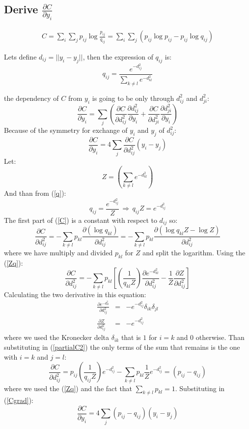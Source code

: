 \documentclass{article}
\begin{document}
\subsection{Derive $\frac{\partial C}{\partial y_{i}}$}
\begin{align}
\label{C}
C=\sum_i\sum_j p_{ij}\log \frac{p_{ij}}{q_{ij}}= \sum_i\sum_j (p_{ij}\log p_{ij}-p_{ij}\log q_{ij})
\end{align}

Lets define $d_{ij}=|| y_i -y_j ||$, then the expression of $q_{ij}$ is:
\begin{equation}\label{q}
q_{ij} =\frac{e^{-d_{ij}^2}}{\sum_{k\neq l} e^{-d_{kl}^2}}
\end{equation}

the dependency of $C$ from $y_i$ is going to be only through $d_{ij}^2$ and $d_{ji}^2$:
 $$
 \frac{\partial C}{\partial y_i}= \sum_j( \frac{\partial C}{\partial d_{ij}^2}\frac{\partial{d_{ij}^2}}{\partial y_i}+ \frac{\partial C}{\partial d_{ji}^2}\frac{\partial{d_{ji}^2}}{\partial y_i})
 $$
Because of the symmetry for exchange of $y_i$ and $y_j$ of $d_{ij}^2$:
 \begin{equation}
 \frac{\partial C}{\partial y_i}= 4\sum_j \frac{\partial C}{\partial d_{ij}^2}(y_i-y_j)
 \end{equation}\label{Cgrad}
 Let:
 \begin{equation}\label{Z}
 Z=(\sum_{k\neq l} e^{-d_{kl}^2})
 \end{equation}
 And than from (\ref{q}):
 \begin{equation}\label{Zq}
 q_{ij} =\frac{e^{-d_{ij}^2}}{Z}\,\Rightarrow \,  q_{ij}Z=e^{-d_{ij}^2}
 \end{equation}
 The first part of (\ref{C}) is a constant with respect to $d_{ij}$ so:
 $$
 \frac{\partial C}{\partial d_{ij}^2}=-\sum_{k\neq l} p_{kl}\frac{\partial(\log q_{kl})}{\partial d_{ij}^2}=
 -\sum_{k\neq l} p_{kl}\frac{\partial(\log q_{kl}Z - \log Z)}{\partial d_{ij}^2}
 $$
 where we have multiply and divided $p_{kl}$  for $Z$ and split the logarithm. Using the (\ref{Zq}):
 \begin{equation}\label{partialC2}
  \frac{\partial C}{\partial d_{ij}^2}=-\sum_{k\neq l} p_{kl}[(\frac{1}{q_{kl}Z})\frac{\partial e^{-d_{kl}^2}}{\partial d_{ij}^2} -\frac{1}{Z}\frac{\partial Z}{\partial d_{ij}^2}]
 \end{equation}
 Calculating the two derivative in this equation:
  \begin{eqnarray*}
 \frac{\partial e^{-d_{kl}^2}}{\partial d_{ij}^2} & = & -e^{-d_{ij}^2} \delta_{ik}\delta_{jl}\\
 \frac{\partial Z}{\partial d_{ij}^2}& = & -e^{-d_{ij}^2} 
  \end{eqnarray*}
where we used the Kronecker delta   $\delta_{ik}$ that is $1$ for $i=k$ and $0$ otherwise. Than substituting in (\ref{partialC2}) the only terms of the sum that remains is the one with $i=k$ and $j=l$:
$$
  \frac{\partial C}{\partial d_{ij}^2} = p_{ij}(\frac{1}{q_{ij}Z}) e^{-d_{ij}^2} -
  \sum_{k \neq l} p_{kl}\frac{1}{Z}e^{-d_{ij}^2}=(p_{ij}- q_{ij})$$
where we used the (\ref{Zq}) and the fact that   $\sum_{k \neq l} p_{kl}=1$. Substituting in (\ref{Cgrad}):
$$
 \frac{\partial C}{\partial y_i}= 4\sum_j (p_{ij}- q_{ij})(y_i-y_j)
$$
\end{document}
